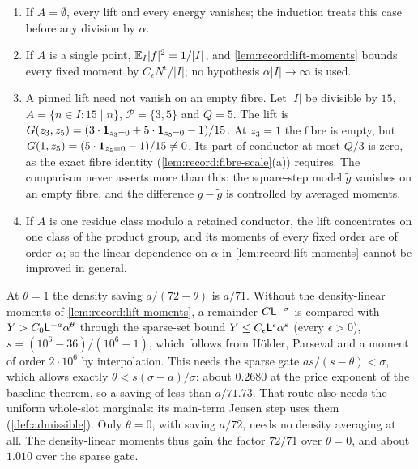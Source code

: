 \begin{remark}\label{rem:record:fibres}
\leavevmode
\begin{enumerate}[label=(\roman*)]
\item If $A=\emptyset$, every lift and every energy vanishes; the induction
 treats this case before any division by $\alpha$.
\item If $A$ is a single point, $\mathbb E_I|f|^2=1/|I|$, and
 \cref{lem:record:lift-moments} bounds every fixed moment by
 $C_\epsilon N^\epsilon/|I|$; no hypothesis $\alpha|I|\to\infty$ is used.
\item A pinned lift need not vanish on an empty fibre. Let $|I|$ be divisible
 by $15$, $A=\{n\in I:15\mid n\}$, $\mathcal P=\{3,5\}$ and $Q=5$. The lift is
 $G(z_3,z_5)=(3\cdot\mathbf 1_{z_3=0}+5\cdot\mathbf 1_{z_5=0}-1)/15$. At $z_3=1$ the
 fibre is empty, but $G(1,z_5)=(5\cdot\mathbf 1_{z_5=0}-1)/15\ne0$. Its part of
 conductor at most $Q/3$ is zero, as the exact fibre identity
 (\cref{lem:record:fibre-scale}(a)) requires. The comparison never asserts
 more than this: the square-step model $\widetilde g$ vanishes on an empty
 fibre, and the difference $g-\widetilde g$ is controlled by averaged
 moments.
\item If $A$ is one residue class modulo a retained conductor, the lift
 concentrates on one class of the product group, and its moments of every
 fixed order are of order $\alpha$; so the linear dependence on $\alpha$ in
 \cref{lem:record:lift-moments} cannot be improved in general.
\end{enumerate}
\end{remark}

\begin{remark}\label{rem:record:theta-ladder}
At $\theta=1$ the density saving $a/(72-\theta)$ is $a/71$. Without the
density-linear moments of \cref{lem:record:lift-moments}, a remainder
$C\mathsf L^{-\sigma}$ is compared with $Y>C_0\mathsf L^{-a}\alpha^\theta$ through the
sparse-set bound $Y\le C_\epsilon\mathsf L^\epsilon\alpha^s$ (every $\epsilon>0$),
$s=(10^6-36)/(10^6-1)$, which follows from H\"older, Parseval and a moment of
order $2\cdot10^6$ by interpolation. This needs the sparse gate $as/(s-\theta)<\sigma$, which allows
exactly $\theta<s(\sigma-a)/\sigma$: about $0.2680$ at the price exponent of
the baseline theorem, so a saving of less than $a/71.73$. That route also needs
the uniform whole-slot marginals: its main-term Jensen step uses them
(\cref{def:admissible}). Only $\theta=0$, with
saving $a/72$, needs no density averaging at all. The density-linear moments
thus gain the factor $72/71$ over $\theta=0$, and about $1.010$ over the
sparse gate.
\end{remark}

